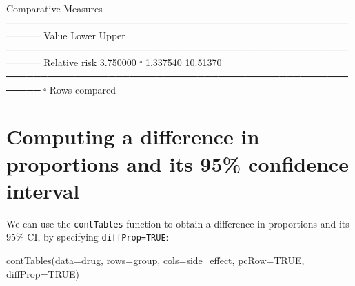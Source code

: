 \documentclass[
  a4paper,
]{memoir}
\newenvironment{Shaded}{\begin{snugshade}}{\end{snugshade}}
\newcommand{\AttributeTok}[1]{\textcolor[rgb]{0.00,0.00,0.00}{#1}}
\newcommand{\ConstantTok}[1]{\textcolor[rgb]{0.00,0.00,0.00}{#1}}
\newcommand{\FloatTok}[1]{\textcolor[rgb]{0.00,0.00,0.00}{#1}}
\newcommand{\FunctionTok}[1]{\textcolor[rgb]{0.00,0.00,0.00}{#1}}
\newcommand{\NormalTok}[1]{\textcolor[rgb]{0.00,0.00,0.00}{#1}}
\begin{document}
\begin{Shaded}
\begin{Highlighting}[]
\NormalTok{ Comparative Measures                                    }
\NormalTok{ ─────────────────────────────────────────────────────── }
\NormalTok{                    Value         Lower       Upper      }
\NormalTok{ ─────────────────────────────────────────────────────── }
\NormalTok{   Relative risk    }\FloatTok{3.750000}\NormalTok{ ᵃ    }\FloatTok{1.337540}    \FloatTok{10.51370}   
\NormalTok{ ─────────────────────────────────────────────────────── }
\NormalTok{   ᵃ Rows compared}
\end{Highlighting}
\end{Shaded}

\section{Computing a difference in proportions and its 95\% confidence
interval}\label{computing-a-difference-in-proportions-and-its-95-confidence-interval}

We can use the \texttt{contTables} function to obtain a difference in
proportions and its 95\% CI, by specifying \texttt{diffProp=TRUE}:

\begin{Shaded}
\begin{Highlighting}[]
\FunctionTok{contTables}\NormalTok{(}\AttributeTok{data=}\NormalTok{drug, }
           \AttributeTok{rows=}\NormalTok{group, }\AttributeTok{cols=}\NormalTok{side\_effect, }
           \AttributeTok{pcRow=}\ConstantTok{TRUE}\NormalTok{, }\AttributeTok{diffProp=}\ConstantTok{TRUE}\NormalTok{)}
\end{Highlighting}
\end{Shaded}
\end{document}
